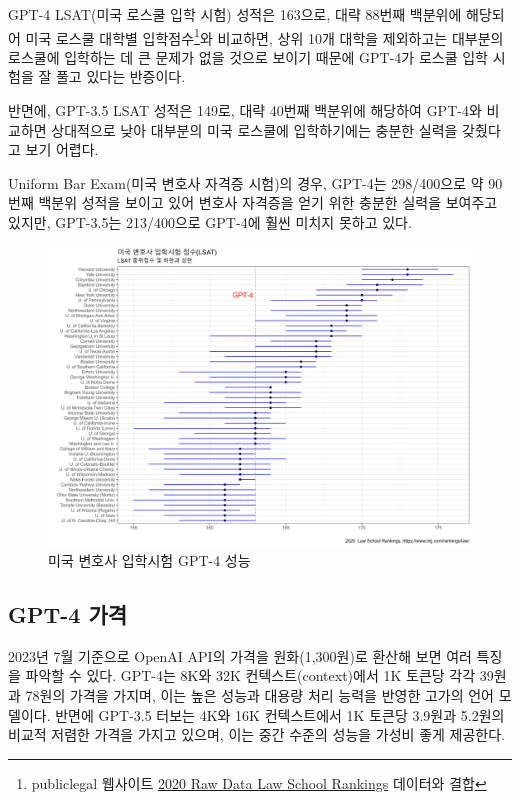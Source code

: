 \documentclass[
  letterpaper,
]{book}
\begin{document}
GPT-4 LSAT(미국 로스쿨 입학 시험) 성적은 163으로, 대략 88번째 백분위에
해당되어 미국 로스쿨 대학별 입학점수\footnote{publiclegal 웹사이트
  \href{https://www.ilrg.com/rankings/law/}{2020 Raw Data Law School
  Rankings} 데이터와 결합}와 비교하면, 상위 10개 대학을 제외하고는
대부분의 로스쿨에 입학하는 데 큰 문제가 없을 것으로 보이기 때문에
GPT-4가 로스쿨 입학 시험을 잘 풀고 있다는 반증이다.

반면에, GPT-3.5 LSAT 성적은 149로, 대략 40번째 백분위에 해당하여 GPT-4와
비교하면 상대적으로 낮아 대부분의 미국 로스쿨에 입학하기에는 충분한
실력을 갖췄다고 보기 어렵다.

Uniform Bar Exam(미국 변호사 자격증 시험)의 경우, GPT-4는 298/400으로 약
90번째 백분위 성적을 보이고 있어 변호사 자격증을 얻기 위한 충분한 실력을
보여주고 있지만, GPT-3.5는 213/400으로 GPT-4에 훨씬 미치지 못하고 있다.

\begin{figure}

{\centering \includegraphics{images/lsat_g.png}

}

\caption{미국 변호사 입학시험 GPT-4 성능}

\end{figure}

\hypertarget{gpt-4-uxac00uxaca9}{%
\subsection{GPT-4 가격}\label{gpt-4-uxac00uxaca9}}

2023년 7월 기준으로 OpenAI API의 가격을 원화(1,300원)로 환산해 보면 여러
특징을 파악할 수 있다. GPT-4는 8K와 32K 컨텍스트(context)에서 1K 토큰당
각각 39원과 78원의 가격을 가지며, 이는 높은 성능과 대용량 처리 능력을
반영한 고가의 언어 모델이다. 반면에 GPT-3.5 터보는 4K와 16K 컨텍스트에서
1K 토큰당 3.9원과 5.2원의 비교적 저렴한 가격을 가지고 있으며, 이는 중간
수준의 성능을 가성비 좋게 제공한다.
\end{document}
